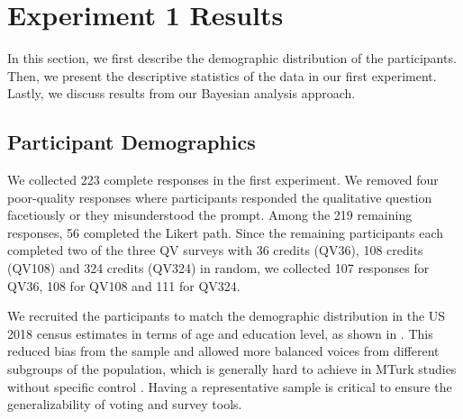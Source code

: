 \section{Experiment 1 Results} \label{results-1-quan}
In this section, we first describe the demographic distribution of the participants. Then, we present the descriptive statistics of the data in our first experiment. Lastly, we discuss results from our Bayesian analysis approach.

\subsection{Participant Demographics}
    
We collected 223 complete responses in the first experiment.  We removed four poor-quality responses where participants responded the qualitative question facetiously or they misunderstood the prompt. Among the 219 remaining responses, 56 completed the Likert path. Since the remaining participants each completed two of the three QV surveys with 36 credits (QV36), 108 credits (QV108) and 324 credits (QV324) in random, we collected 107 responses for QV36,  108 for QV108 and 111 for QV324. 

We recruited the participants to match the demographic distribution in the US 2018 census estimates in terms of age and education level, as shown in . This reduced bias from the sample and allowed more balanced voices from different subgroups of the population, which is generally hard to achieve in MTurk studies without specific control \cite{difallah2018demographics}. Having a representative sample is critical to ensure the generalizability of voting and survey tools. 


